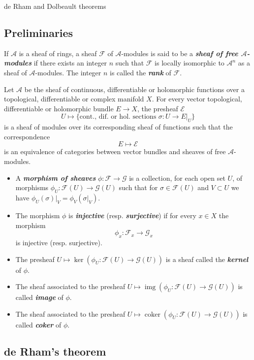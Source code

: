 \documentclass{article}
\numberwithin{equation}{section}
\newcommand{\Ac}{\mathcal{A}}
\newcommand{\Ec}{\mathcal{E}}
\newcommand{\Fc}{\mathcal{F}}
\newcommand{\Gc}{\mathcal{G}}
\DeclareMathOperator{\img}{img}
\DeclareMathOperator{\coker}{coker}
\begin{document}
	{\Large de Rham and Dolbeault theorems}
	\subsection*{Preliminaries}
	\begin{defn}If $\Ac$ is a sheaf of rings, a sheaf $\Fc$ of $\Ac$-modules is said to be a \textbf{\textit{sheaf of free $\Ac$-modules}} if there exists an integer $n$ such that $\Fc$ is locally isomorphic to $\Ac^n$ as a sheaf of $\Ac$-modules. The integer $n$ is called the \textbf{\textit{rank}} of $\Fc$.
	\end{defn}
	\begin{lemma}
		Let $\Ac$ be the sheaf of continuous, differentiable or holomorphic functions over a topological, differentiable or complex manifold $X$. For every vector topological, differentiable or holomorphic bundle $E\to X$, the presheaf $\Ec$
		\[U\mapsto\{\text{cont., dif. or hol. sections }\sigma:U\to E|_U\}\]
		is a sheaf of modules over its corresponding sheaf of functions such that the correspondence
		\[E\mapsto\Ec\]
		is an equivalence of categories between vector bundles and sheaves of free $\Ac$-modules.
	\end{lemma}
	\begin{defn}
			\begin{itemize}
			\item A \textbf{\textit{morphism of sheaves}} $\phi:\Fc\to\Gc$ is a collection, for each open set $U$, of morphisms $\phi_U:\Fc(U)\to\Gc(U)$ such that for $\sigma\in\Fc(U)$ and $V\subset U$ we have $\phi_U(\sigma)|_V=\phi_V(\sigma|_V)$.
			\item The morphism $\phi$ is \textbf{\textit{injective}} (resp. \textbf{\textit{surjective}}) if for every $x\in X$ the morphism
			\[\phi_x:\Fc_x\to\Gc_x\]
			is injective (resp. surjective).
			\item The presheaf $U\mapsto \ker(\phi_U:\Fc(U)\to\Gc(U))$ is a sheaf called the \textbf{\textit{kernel}} of $\phi$.
			\item The sheaf associated to the presheaf $U\mapsto\img(\phi_U:\Fc(U)\to\Gc(U))$ is called \textbf{\textit{image}} of $\phi$.
			\item The sheaf associated to the presheaf $U\mapsto\coker(\phi_U:\Fc(U)\to\Gc(U))$ is called \textbf{\textit{coker}} of $\phi$.
		\end{itemize}
		\end{defn}
	\subsection*{de Rham's theorem}
	
\end{document}
